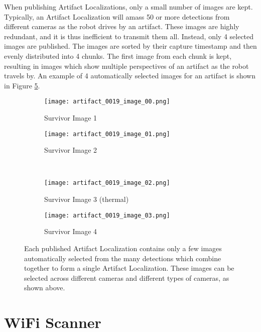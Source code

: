 When publishing Artifact Localizations, only a small number of images are kept. Typically, an Artifact Localization will amass 50 or more detections from different cameras as the robot drives by an artifact. These images are highly redundant, and it is thus inefficient to transmit them all. Instead, only 4 selected images are published. The images are sorted by their capture timestamp and then evenly distributed into 4 chunks. The first image from each chunk is kept, resulting in images which show multiple perspectives of an artifact as the robot travels by. An example of 4 automatically selected images for an artifact is shown in Figure \ref{automatically_selected_images}.

\begin{figure}
	\centering
	\begin{subfigure}{0.45\textwidth}
		\texttt{[image: artifact\_0019\_image\_00.png]}
		\caption{Survivor Image 1}
		\label{survivor_image_1}
	\end{subfigure}		
	\hfill
	\begin{subfigure}{0.45\textwidth}
		\texttt{[image: artifact\_0019\_image\_01.png]}
		\caption{Survivor Image 2}
		\label{survivor_image_2}
	\end{subfigure}
	\\
	\begin{subfigure}{0.45\textwidth}
		\centering
		\texttt{[image: artifact\_0019\_image\_02.png]}
		\caption{Survivor Image 3 (thermal)}
		\label{survivor_image_3}
	\end{subfigure}
	\hfill
	\begin{subfigure}{0.45\textwidth}
		\texttt{[image: artifact\_0019\_image\_03.png]}
		\caption{Survivor Image 4}
		\label{survivor_image_4}
	\end{subfigure}		
	\caption[Automatically selected images from Artifact Localizations]{Each published Artifact Localization contains only a few images automatically selected from the many detections which combine together to form a single Artifact Localization. These images can be selected across different cameras and different types of cameras, as shown above.}
	\label{automatically_selected_images}
\end{figure}

\section{WiFi Scanner}

